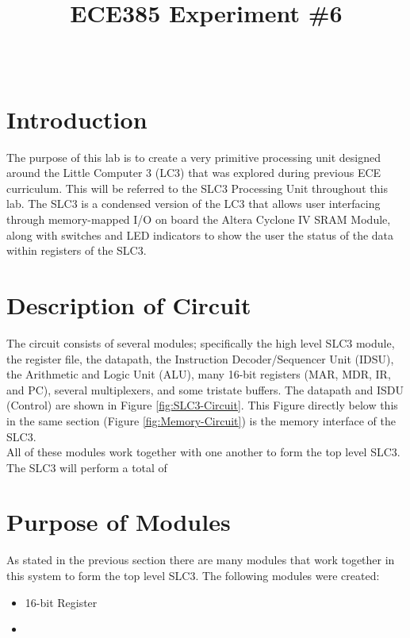 \documentclass[journal, twocolumn, final,11pt,letterpaper]{IEEEtran}
\title{ECE385 Experiment \#6
	}
\author{
\IEEEauthorblockN{Eric Meyers, Ryan Helsdingen}\\
\IEEEauthorblockA{Section ABG; TAs: Ben Delay, Shuo Liu \\
March 9th, 2016 \\
emeyer7, helsdin2}}
\begin{document}
	
\maketitle
\singlespacing

\section{Introduction}
The purpose of this lab is to create a very primitive processing unit designed around the Little Computer 3 (LC3) that was explored during previous ECE curriculum. This will be referred to the SLC3 Processing Unit throughout this lab. The SLC3 is a condensed version of the LC3 that allows user interfacing through memory-mapped I/O on board the Altera Cyclone IV SRAM Module, along with switches and LED indicators to show the user the status of the data within registers of the SLC3.  

\section{Description of Circuit}
The circuit consists of several modules; specifically the high level SLC­3 module, the register file, the datapath, the Instruction Decoder/Sequencer Unit (IDSU), the Arithmetic and Logic Unit (ALU), many 16-bit registers (MAR, MDR, IR, and PC), several multiplexers, and some tristate buffers. The datapath and ISDU (Control) are shown in Figure \ref{fig:SLC3-Circuit}. This Figure directly below this in the same section (Figure \ref{fig:Memory-Circuit}) is the memory interface of the SLC3.\\

All of these modules work together with one another to form the top level SLC3. The SLC3 will perform a total of 



\section{Purpose of Modules}
As stated in the previous section there are many modules that work together in this system to form the top level SLC3. The following modules were created:
\begin{itemize}
	\item 16-bit Register
	\item 
\end{itemize}
\end{document}
